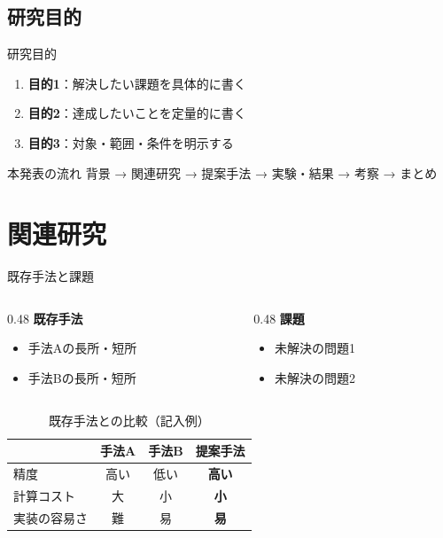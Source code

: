 \documentclass[uplatex,dvipdfmx,aspectratio=169]{beamer}
\begin{document}
\subsection{研究目的}
\begin{frame}{研究目的}
  \begin{enumerate}
    \item \textbf{目的1}：解決したい課題を具体的に書く
    \item \textbf{目的2}：達成したいことを定量的に書く
    \item \textbf{目的3}：対象・範囲・条件を明示する
  \end{enumerate}
  \pause
  \begin{exampleblock}{本発表の流れ}
    背景 → 関連研究 → 提案手法 → 実験・結果 → 考察 → まとめ
  \end{exampleblock}
\end{frame}

\section{関連研究}

\begin{frame}{既存手法と課題}
  \begin{columns}[t]
    \begin{column}{0.48\linewidth}
      \textbf{既存手法}
      \begin{itemize}
        \item 手法Aの長所・短所
        \item 手法Bの長所・短所
      \end{itemize}
    \end{column}
    \begin{column}{0.48\linewidth}
      \textbf{課題}
      \begin{itemize}
        \item 未解決の問題1
        \item 未解決の問題2
      \end{itemize}
    \end{column}
  \end{columns}

  \vspace{3mm}
  \begin{table}
    \centering
    \caption{既存手法との比較（記入例）}
    \label{tab:comparison}
    \begin{tabular}{lccc}
      \toprule
      & 手法A & 手法B & 提案手法 \\
      \midrule
      精度 & 高い & 低い & \textbf{高い} \\
      計算コスト & 大 & 小 & \textbf{小} \\
      実装の容易さ & 難 & 易 & \textbf{易} \\
      \bottomrule
    \end{tabular}
  \end{table}
\end{frame}
\end{document}
